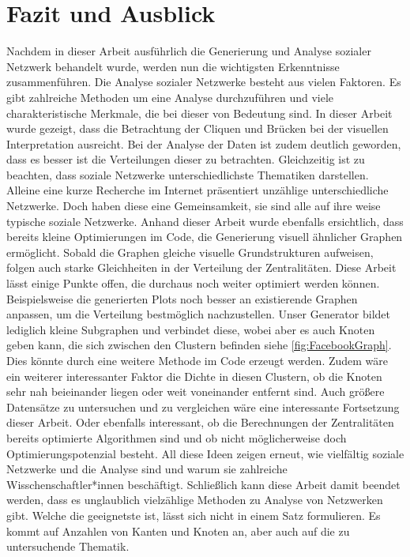 \chapter{Fazit und Ausblick}\label{ch:fazit}

Nachdem in dieser Arbeit ausführlich die Generierung und Analyse sozialer Netzwerk behandelt wurde, werden nun die wichtigsten Erkenntnisse zusammenführen. Die Analyse sozialer Netzwerke besteht aus vielen Faktoren. Es gibt zahlreiche Methoden um eine Analyse durchzuführen und viele charakteristische Merkmale, die bei dieser von Bedeutung sind. In dieser Arbeit wurde gezeigt, dass die Betrachtung der Cliquen und Brücken bei der visuellen Interpretation ausreicht. Bei der Analyse der Daten ist zudem deutlich geworden, dass es besser ist die Verteilungen dieser zu betrachten. Gleichzeitig ist zu beachten, dass soziale Netzwerke unterschiedlichste Thematiken darstellen. Alleine eine kurze Recherche im Internet präsentiert unzählige unterschiedliche Netzwerke. Doch haben diese eine Gemeinsamkeit, sie sind alle auf ihre weise typische soziale Netzwerke. Anhand dieser Arbeit wurde ebenfalls ersichtlich, dass bereits kleine Optimierungen im Code, die Generierung visuell ähnlicher Graphen ermöglicht. Sobald die Graphen gleiche visuelle Grundstrukturen aufweisen, folgen auch starke Gleichheiten in der Verteilung der Zentralitäten. Diese Arbeit lässt einige Punkte offen, die durchaus noch weiter optimiert werden können. Beispielsweise die generierten Plots noch besser an existierende Graphen anpassen, um die Verteilung bestmöglich nachzustellen. 
Unser Generator bildet lediglich kleine Subgraphen und verbindet diese, wobei aber es auch Knoten geben kann, die sich zwischen den Clustern befinden siehe \ref{fig:FacebookGraph}. Dies könnte durch eine weitere Methode im Code erzeugt werden. Zudem wäre ein weiterer interessanter Faktor die Dichte in diesen Clustern, ob die Knoten sehr nah beieinander liegen oder weit voneinander entfernt sind.
Auch größere Datensätze zu untersuchen und zu vergleichen wäre eine interessante Fortsetzung dieser Arbeit. Oder ebenfalls interessant, ob die Berechnungen der Zentralitäten bereits optimierte Algorithmen sind und ob nicht möglicherweise doch Optimierungspotenzial besteht.  
All diese Ideen zeigen erneut, wie vielfältig soziale Netzwerke und die Analyse sind und warum sie zahlreiche Wisschenschaftler*innen beschäftigt. Schließlich kann diese Arbeit damit beendet werden, dass es unglaublich vielzählige Methoden zu Analyse von Netzwerken gibt. Welche die geeignetste ist, lässt sich nicht in einem Satz formulieren. Es kommt auf Anzahlen von Kanten und Knoten an, aber auch auf die zu untersuchende Thematik.